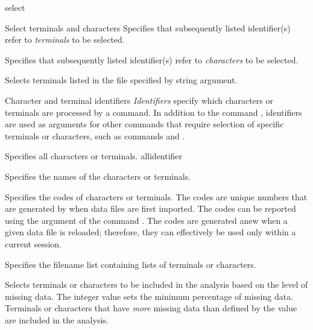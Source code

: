 \begin{command}{select}{}
\begin{arguments}
\begin{argumentgroup}{Select terminals and characters}
                {Specifies that subsequently listed identifier(s)
                refer to \emph{terminals} to be selected.} 
                {}

                {Specifies that subsequently listed identifier(s)
                refer to \emph{characters} to be selected.}
                {}

                {Selects terminals listed in the file specified by string argument.}
                {}

		\end{argumentgroup}
		
        \begin{argumentgroup}{Character and terminal identifiers}\label{identifiers}
        {\emph{Identifiers} specify which characters or terminals are processed by a command.
        In addition to the command , identifiers are used as
        arguments for other commands that require selection of specific terminals or
        characters, such as commands  and
        .}

                {Specifies all characters or terminals.}
                {allidentifier}

                {Specifies the names of the characters or terminals.}
                {}

                {Specifies the codes of characters or terminals. The codes are unique
                numbers that are generated by \poy when data files are first imported.
                The codes can be reported using the argument 
                of the command . The codes are generated anew
                when a given data file is reloaded; therefore, they can effectively be used
                only within a current \poy session.}
                {}

                {Specifies the filename list containing lists of terminals or
                characters.}
                {}

                {Selects terminals or characters to be included in the analysis
                based on the level of missing data. The
                integer value sets the minimum percentage of missing
                data. Terminals or characters that have \emph{more} missing data
                than defined by the value are included in the analysis.}
                {}
               

\end{argumentgroup}
\end{arguments}
\end{command}
